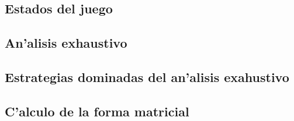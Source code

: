 \subsection{Estados del juego}



\subsection{An'alisis exhaustivo}



\subsection{Estrategias dominadas del an'alisis exahustivo}


\subsection{C'alculo de la forma matricial}


